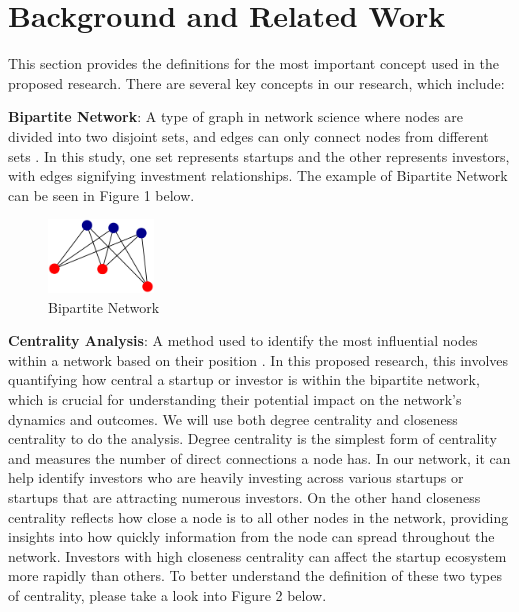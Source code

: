 \documentclass[a4paper,11pt]{article}
\begin{document}
\section{Background and Related Work}

This section provides the definitions for the most important concept used in the proposed research. There are several key concepts in our research, which include:

\textbf{Bipartite Network}: A type of graph in network science where nodes are divided into two disjoint sets, and edges can only connect nodes from different sets \cite{guillaume2005a}. In this study, one set represents startups and the other represents investors, with edges signifying investment relationships. The example of Bipartite Network can be seen in Figure 1 below.

\begin{figure}[h]
\centering
\includegraphics[width=0.25\textwidth]{bipartite.png}
\caption{Bipartite Network}
\end{figure}

\textbf{Centrality Analysis}: A method used to identify the most influential nodes within a network based on their position \cite{rodrigues2019a}. In this proposed research, this involves quantifying how central a startup or investor is within the bipartite network, which is crucial for understanding their potential impact on the network’s dynamics and outcomes. We will use both degree centrality and closeness centrality to do the analysis. Degree centrality is the simplest form of centrality and measures the number of direct connections a node has. In our network, it can help identify investors who are heavily investing across various startups or startups that are attracting numerous investors. On the other hand closeness centrality reflects how close a node is to all other nodes in the network, providing insights into how quickly information from the node can spread throughout the network. Investors with high closeness centrality can affect the startup ecosystem more rapidly than others. To better understand the definition of these two types of centrality, please take a look into Figure 2 below.
\end{document}
